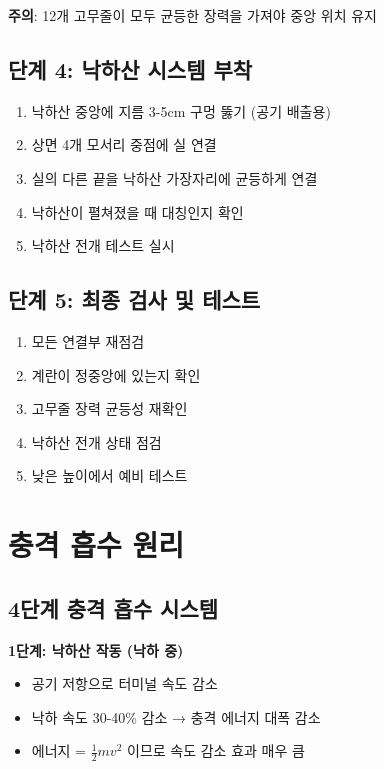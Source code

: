 \documentclass[a4paper,12pt]{article}
\begin{document}
\begin{CJK}{UTF8}{mj}
\textbf{주의}: 12개 고무줄이 모두 균등한 장력을 가져야 중앙 위치 유지

\subsection{단계 4: 낙하산 시스템 부착}

\begin{enumerate}
    \item 낙하산 중앙에 지름 3-5cm 구멍 뚫기 (공기 배출용)
    \item 상면 4개 모서리 중점에 실 연결
    \item 실의 다른 끝을 낙하산 가장자리에 균등하게 연결
    \item 낙하산이 펼쳐졌을 때 대칭인지 확인
    \item 낙하산 전개 테스트 실시
\end{enumerate}

\subsection{단계 5: 최종 검사 및 테스트}

\begin{enumerate}
    \item 모든 연결부 재점검
    \item 계란이 정중앙에 있는지 확인
    \item 고무줄 장력 균등성 재확인
    \item 낙하산 전개 상태 점검
    \item 낮은 높이에서 예비 테스트
\end{enumerate}

\section{충격 흡수 원리}

\subsection{4단계 충격 흡수 시스템}

\textbf{1단계: 낙하산 작동 (낙하 중)}
\begin{itemize}
    \item 공기 저항으로 터미널 속도 감소
    \item 낙하 속도 30-40\% 감소 → 충격 에너지 대폭 감소
    \item 에너지 = $\frac{1}{2}mv^2$ 이므로 속도 감소 효과 매우 큼
\end{itemize}


\end{CJK}
\end{document}
